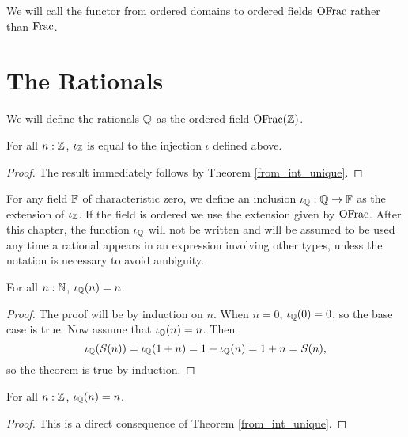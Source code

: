 \documentclass[../../math.tex]{subfiles}
\begin{document}
We will call the functor from ordered domains to ordered fields $\operatorname{OFrac}$ rather
than $\operatorname{Frac}$.

\section{The Rationals}

We will define the rationals $\mathbb{Q}$ as the ordered field $\operatorname{OFrac}(\mathbb{Z})$.

\begin{theorem}
    For all $n : \mathbb{Z}$, $\iota_{\mathbb{Z}}$ is equal to the injection $\iota$ defined
    above.
\end{theorem}
\begin{proof}
    The result immediately follows by Theorem \ref{from_int_unique}.
\end{proof}

\begin{definition}
    For any field $\mathbb{F}$ of characteristic zero, we define an inclusion $\iota_{\mathbb{Q}} : \mathbb{Q}
    \to \mathbb{F}$ as the extension of $\iota_{\mathbb{Z}}$.  If the field is ordered we use the
    extension given by $\operatorname{OFrac}$.  After this chapter, the function $\iota_{\mathbb{Q}}$ will
    not be written and will be assumed to be used any time a rational appears in
    an expression involving other types, unless the notation is necessary to
    avoid ambiguity.
\end{definition}

\begin{theorem}
    For all $n : \mathbb{N}$, $\iota_{\mathbb{Q}}(n) = n$.
\end{theorem}
\begin{proof}
    The proof will be by induction on $n$.  When $n = 0$, $\iota_{\mathbb{Q}}(0) = 0$, so the
    base case is true.  Now assume that $\iota_{\mathbb{Q}}(n) = n$.  Then
    \[
        \iota_{\mathbb{Q}}(S(n)) = \iota_{\mathbb{Q}}(1 + n) = 1 + \iota_{\mathbb{Q}}(n) = 1 + n = S(n),
    \]
    so the theorem is true by induction.
\end{proof}

\begin{theorem}
    For all $n : \mathbb{Z}$, $\iota_{\mathbb{Q}}(n) = n$.
\end{theorem}
\begin{proof}
    This is a direct consequence of Theorem \ref{from_int_unique}.
\end{proof}
\end{document}
